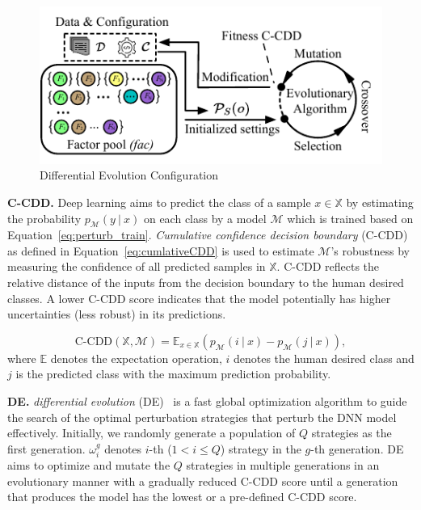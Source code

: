 \begin{figure}
    \centering
        \vspace{-3mm}
    \includegraphics[scale=1]{fig/Task1.pdf}
    \vspace{-3mm}
    \caption{\footnotesize Differential Evolution Configuration}
    \label{fig:task1frame}
\end{figure}


\textbf{C-CDD.} Deep learning aims to predict the class of a sample $x\in\mathbb{X}$ by estimating the probability $p_{\mathcal{M}}(y\ |\ x)$ on each class by a model $\mathcal{M}$ which is trained based on Equation~\ref{eq:perturb_train}. \emph{Cumulative confidence decision boundary} (C-CDD) as defined in Equation~\ref{eq:cumlativeCDD} is used to estimate $\mathcal{M}$'s robustness by measuring the confidence of all predicted samples in $\mathbb{X}$. 
C-CDD reflects the relative distance of the inputs from the decision boundary to the human desired classes. 
A lower C-CDD score indicates that the model potentially has higher uncertainties (less robust) in its predictions. 

\begin{equation}\label{eq:cumlativeCDD}
  \text{C-CDD} (\mathbb{X}, \mathcal{M})=  \mathbb{E}_{x\in\mathbb{X}}(p_{\mathcal{M}}(i\ |\ x)-p_{\mathcal{M}}(j\ |\ x)),
\end{equation}
where $\mathbb{E}$ denotes the expectation operation, $i$ denotes the human desired class and $j$ is the predicted class with the maximum prediction probability. 


\textbf{DE.} \emph{differential evolution} (DE)~\cite{DBLP:conf/ijcai/AwadMH21} is a fast global optimization algorithm to guide the search of the optimal perturbation strategies that perturb the DNN model effectively. 
Initially, we randomly generate a population of $Q$ strategies as the first generation. 
$\omega_i^g$ denotes $i$-th ($1 < i \leq Q$) strategy in the $g$-th generation. 
DE aims to optimize and mutate the $Q$ strategies in multiple generations in an evolutionary manner with a gradually reduced C-CDD score until a generation that produces the model has the lowest or a pre-defined C-CDD score. 


